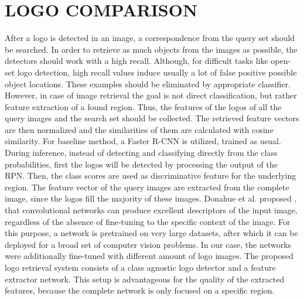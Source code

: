 \documentclass[a4paper,twoside]{article}
\begin{document}
\section{\uppercase{Logo Comparison}}
After a logo is detected in an image, a correspondence from the query set should be searched. In order to retrieve as much objects from the images as possible, the detectors should work with a high recall. Although, for difficult tasks like open-set logo detection, high recall values induce usually a lot of false positive possible object locations. These examples should be eliminated by appropriate classifier. However, in case of image retrieval the goal is not direct classification, but rather feature extraction of a found region. Thus, the features of the logos of all the query images and the search set should be collected. The retrieved feature vectors are then normalized and the similarities of them are calculated with cosine similarity.
For baseline method, a Faster R-CNN is utilized, trained as usual. During inference, instead of detecting and classifying directly from the class probabilities, first the logos will be detected by processing the output of the RPN. Then, the class scores are used as discriminative feature for the underlying region. The feature vector of the query images are extracted from the complete image, since the logos fill the majority of these images.
Donahue et al. proposed \cite{donahue2015}, that convolutional networks can produce excellent descriptors of the input image, regardless of the absence of fine-tuning to the specific context of the image. For this purpose, a network is pretrained on very large datasets, after which it can be deployed for a broad set of computer vision problems. In our case, the networks were additionally fine-tuned with different amount of logo images.
The proposed logo retrieval system consists of a class agnostic logo detector and a feature extractor network. This setup is advantageous for the quality of the extracted features, because the complete network is only focused on a specific region.
\end{document}

